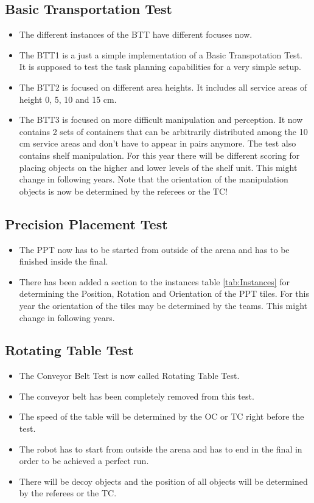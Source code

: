 \subsection{Basic Transportation Test}
\begin{itemize}
  \item The different instances of the BTT have different focuses now.
  \item The BTT1 is a just a simple implementation of a Basic Transpotation Test. It is supposed to test the task planning capabilities for a very simple setup.
  \item The BTT2 is focused on different area heights. It includes all service areas of height 0, 5, 10 and 15 cm.
  \item The BTT3 is focused on more difficult manipulation and perception. It now contains 2 sets of containers that can be arbitrarily distributed among the 10 cm service areas and don't have to appear in pairs anymore. The test also contains shelf manipulation. For this year there will be different scoring for placing objects on the higher and lower levels of the shelf unit. This might change in following years. Note that the orientation of the manipulation objects is now be determined by the referees or the TC!
\end{itemize}

\subsection{Precision Placement Test}
\begin{itemize}
  \item The PPT now has to be started from outside of the arena and has to be finished inside the final.
  \item There has been added a section to the instances table \ref{tab:Instances} for determining the Position, Rotation and Orientation of the PPT tiles. For this year the orientation of the tiles may be determined by the teams. This might change in following years.
\end{itemize}

\subsection{Rotating Table Test}
\begin{itemize}
  \item The Conveyor Belt Test is now called Rotating Table Test.
  \item The conveyor belt has been completely removed from this test.
  \item The speed of the table will be determined by the OC or TC right before the test.
  \item The robot has to start from outside the arena and has to end in the final in order to be achieved a perfect run.
  \item There will be decoy objects and the position of all objects will be determined by the referees or the TC.
\end{itemize}
